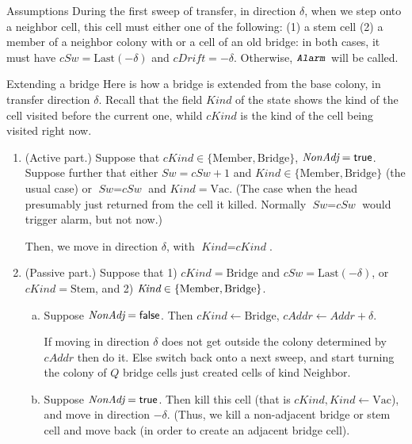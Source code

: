 \documentclass[12pt]{memoir}
\newcommand{\fld}[1]{\ensuremath{\textit{#1}}}
\newcommand{\rul}[1]{\ensuremath{\texttt{\slshape #1\/}}}
\newcommand{\Addr}{\fld{Addr}}
\newcommand{\cAddr}{\fld{cAddr}}
\newcommand{\cDrift}{\fld{cDrift}}
\renewcommand{\G}{\fld{NonAdj}} %
\newcommand{\Kind}{\fld{Kind}}
\newcommand{\cKind}{\fld{cKind}}
\newcommand{\Sweep}{\fld{Sw}}
\newcommand{\cSweep}{\fld{cSw}}
\newcommand{\Bridge}{\mathrm{Bridge}}
\newcommand{\Last}{\mathrm{Last}}
\newcommand{\Member}{\mathrm{Member}}
\newcommand{\Neighbor}{\mathrm{Neighbor}}
\newcommand{\Stem}{\mathrm{Stem}}
\newcommand{\Vacant}{\mathrm{Vac}}
\newcommand{\Alarm}{\rul{Alarm}}
\begin{document}
    \begin{flushdescription}
    \item [Assumptions]
      During the first sweep of transfer, in direction \( \delta \), 
      when we step onto a neighbor cell, this cell must either one of the following:
      (1) a stem cell (2) a member of a neighbor colony with or a cell of an old bridge: in
both cases, it must have $\cSweep = \Last(-\delta)$ and $\cDrift=-\delta$.
      Otherwise, $\Alarm$ will be called.

     \item [Extending a bridge]
       Here is how a bridge is extended from the base colony, in 
transfer direction \( \delta \).
Recall that the field \( \Kind \) of the state shows the kind of the cell visited
before the current one, whild \( \cKind \) is the kind of the cell being visited right now.

\begin{enumerate}[1.]

\item
  \begin{sloppypar}
 (Active part.)
  Suppose that $\cKind \in \{\Member,\Bridge\}$, \( \G=\true \).
Suppose further that either \( \Sweep=\cSweep+1 \) 
and \( \Kind\in\{\Member,\Bridge\} \) (the usual case)
or \( \Sweep=\cSweep \) and $\Kind  = \Vacant$.
(The case when the head presumably just returned from the cell it killed.
Normally \( \Sweep=\cSweep \) would trigger alarm, but not now.)    
  \end{sloppypar}

 Then, we move in direction $\delta$, with \( \Kind=\cKind \).

\item(Passive part.)
 Suppose that 1) \( \cKind =\Bridge \) and \( \cSweep=\Last(-\delta) \),
or \( \cKind=\Stem \), and 2) $\Kind  \in \set{\Member, \Bridge}$.

 \begin{enumerate}[a.]
 \item Suppose $\G = \false$.
Then $\cKind \gets \Bridge$, \( \cAddr\gets\Addr+\delta \).

If moving in direction \( \delta \) does not get outside the colony determined by \( \cAddr \)
then do it.
Else switch back onto a next sweep, and start turning the colony of \( Q \) 
bridge cells just created cells of kind \( \Neighbor \).

 \item Suppose \( \G=\true \).
Then kill this cell (that is $\cKind,\Kind \gets \Vacant$), 
and move in direction $-\delta$.
(Thus, we kill a non-adjacent bridge or stem cell and move back (in order 
to create an adjacent bridge cell).
\end{enumerate}


\end{enumerate}
\end{flushdescription}
\end{document}
